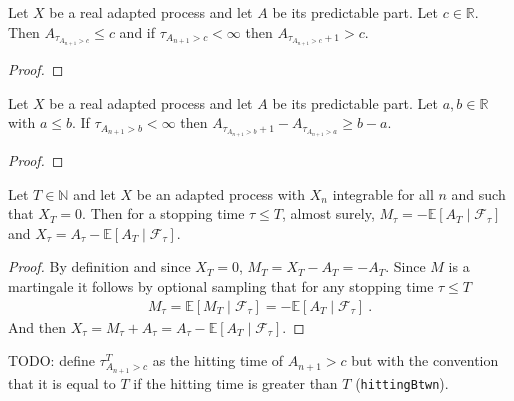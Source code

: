 \begin{lemma}\label{lem:leastGT_predictablePart_le}
Let $X$ be a real adapted process and let $A$ be its predictable part. Let $c \in \mathbb{R}$.
Then $A_{\tau_{A_{n + 1} > c}} \le c$ and if $\tau_{A_{n + 1} > c} < \infty$ then $A_{\tau_{A_{n + 1} > c} + 1} > c$.
\end{lemma}

\begin{proof}

\end{proof}


\begin{lemma}\label{lem:leastGT_predictablePart_sub_ge}
Let $X$ be a real adapted process and let $A$ be its predictable part.
Let $a, b \in \mathbb{R}$ with $a \le b$.
If $\tau_{A_{n + 1} > b} < \infty$ then $A_{\tau_{A_{n + 1} > b}+1} - A_{\tau_{A_{n + 1} > a}} \ge b - a$.
\end{lemma}

\begin{proof}

\end{proof}


\begin{lemma}\label{lem:uniformIntegrable_predictablePart_aux1}
Let $T \in \mathbb{N}$ and let $X$ be an adapted process with $X_n$ integrable for all $n$ and such that $X_T = 0$.
Then for a stopping time $\tau \le T$, almost surely, $M_\tau = -\mathbb{E}[A_T \mid \mathcal{F}_\tau]$ and $X_\tau = A_\tau - \mathbb{E}[A_T \mid \mathcal{F}_\tau]$.
\end{lemma}

\begin{proof}
By definition and since $X_T = 0$, $M_T = X_T - A_T = - A_T$.
Since $M$ is a martingale it follows by optional sampling that for any stopping time $\tau \le T$
\begin{align*}
  M_\tau = \mathbb{E}[M_T \mid \mathcal{F}_\tau] = -\mathbb{E}[A_T \mid \mathcal{F}_\tau]
  \: .
\end{align*}
And then $X_\tau = M_\tau + A_\tau = A_\tau - \mathbb{E}[A_T \mid \mathcal{F}_\tau]$.
\end{proof}


TODO: define $\tau^T_{A_{n+1}>c}$ as the hitting time of $A_{n+1} > c$ but with the convention that it is equal to $T$ if the hitting time is greater than $T$ (\texttt{hittingBtwn}).

